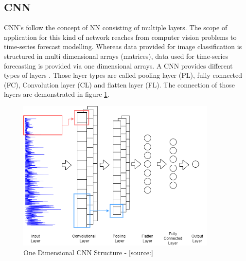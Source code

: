 \subsection{CNN}
\label{sec:cnn}
CNN's follow the concept of NN consisting of multiple layers. The scope of application for this kind of network reaches from computer vision problems to time-series forecast modelling. Whereas data provided for image classification is structured in multi dimensional arrays (matrices), data used for time-series forecasting is provided via one dimensional arrays.\cite{cnn_intro} A CNN provides different types of layers . Those layer types are called pooling layer (PL), fully connected (FC), Convolution layer (CL) and flatten layer (FL). The connection of those layers are demonstrated in figure \ref{fig:cnn_struct}.
\begin{figure}[H]
	\centering
		\includegraphics[width=10cm]{images/1d_cnn_model}
	\caption{One Dimensional CNN Structure - [source:\cite{cnn_vechicle}]}
	\label{fig:cnn_struct}
\end{figure}

